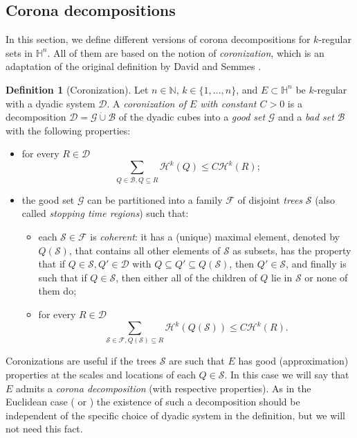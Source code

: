 \documentclass[12pt]{amsart}
\numberwithin{equation}{section}
\theoremstyle{plain}
\theoremstyle{definition}
\newtheorem{definition}[theorem]{Definition}
\theoremstyle{remark}
\begin{document}
\subsection{Corona decompositions}\label{ss:CoronaDef}
In this section, we define different versions of corona decompositions for $k$-regular sets in $\mathbb{H}^n$. All of them are based on the notion of \emph{coronization}, which is an adaptation of the original definition by David and Semmes \cite[(3.14)-(3.18)]{David2}.

\begin{definition}[Coronization]\label{d:coronization}
 Let $n\in \mathbb{N}$, $k\in \{1,\ldots,n\}$, and $E\subset \mathbb{H}^n$ be $k$-regular with a dyadic system $\mathcal{D}$.  A \emph{coronization of $E$ with constant $C>0$} is a decomposition $\mathcal{D}=\mathcal{G} \dot{\cup}\mathcal{B}$ of the dyadic cubes into a  \emph{good set} $\mathcal G$ and a \emph{bad set}
 $\mathcal B$ with the following properties:
    \begin{itemize}
        \item for every $R\in\mathcal{D}$ \begin{equation*}
            \sum_{Q\in\mathcal B, Q\subseteq R} \mathcal{H}^k(Q)\leq C\mathcal{H}^k(R);
        \end{equation*}
        \item the good set $\mathcal G$ can be partitioned into a family $\mathcal F$ of disjoint \emph{trees} $\mathcal S$ (also called \emph{stopping time regions}) such that:
        \begin{itemize}
           \item each $\mathcal S\in\mathcal F$ is \textit{coherent}: it has a (unique) maximal element, denoted by $Q(\mathcal S)$, that contains all other elements of $\mathcal{S}$ as subsets, has the property that if 
        $Q\in \mathcal S, Q'\in\mathcal{D}$ with $Q\subseteq Q'\subseteq Q(\mathcal S)$, then $Q'\in\mathcal S$, and finally is such that if $Q\in \mathcal{S}$, then either all of the children of $Q$ lie in $\mathcal{S}$ or none of them do;
         \item for every $R\in\mathcal{D}$ \begin{equation}\label{carlesonpackingcond}
            \sum_{\mathcal S\in\mathcal F, Q(\mathcal S)\subseteq R} \mathcal{H}^k(Q(\mathcal S))\leq C\mathcal{H}^k(R).
        \end{equation}
    \end{itemize}
 \end{itemize}
\end{definition}
Coronizations are useful if the trees $\mathcal{S}$ are such that $E$ has good (approximation) properties at the scales and locations of each $Q\in \mathcal{S}$. In this case we will say that $E$ admits a \emph{corona decomposition} (with respective properties). As in the Euclidean case (\cite[p.20]{David1} or \cite[p.58]{David2}) the existence of such a decomposition should be independent of the specific choice of dyadic system in the definition, but we will not need this fact.
\end{document}

